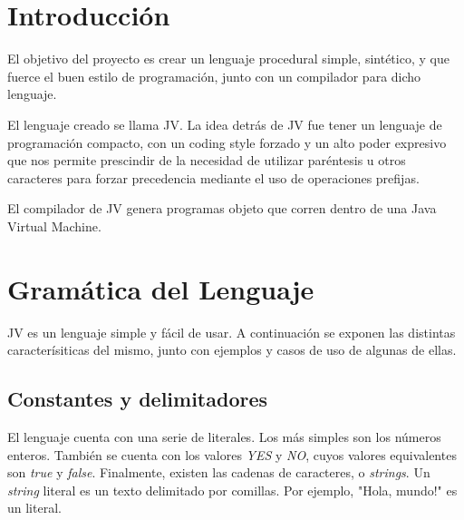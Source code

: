 \documentclass{article}
\begin{document}
    
    \clearpage
    \tableofcontents
    
    \clearpage

    \section{Introducción}
        \par El objetivo del proyecto es crear un lenguaje procedural simple, sintético, y que fuerce el buen estilo de programación, junto con un compilador para dicho lenguaje.\\
        \par El lenguaje creado se llama JV. La idea detrás de JV fue tener un lenguaje de programación compacto, con un coding style forzado y un alto poder expresivo que nos permite prescindir de la necesidad de utilizar paréntesis u otros caracteres para forzar precedencia mediante el uso de operaciones prefijas.
        \par El compilador de JV genera  programas objeto que corren dentro de una Java Virtual Machine.
    \clearpage


    \section{Gramática del Lenguaje}

        \par JV es un lenguaje simple y fácil de usar. A continuación se exponen las distintas caracterísiticas del mismo, junto con ejemplos y casos de uso de algunas de ellas.
        \\

        \subsection{Constantes y delimitadores}

            \par El lenguaje cuenta con una serie de literales. Los más simples son los números enteros. También se cuenta con los valores \textit{YES} y \textit{NO}, cuyos valores equivalentes son \textit{true} y \textit{false}. Finalmente, existen las cadenas de caracteres, o \textit{strings}. Un \textit{string} literal es un texto delimitado por comillas. Por ejemplo, "Hola, mundo!" es un literal. 
\end{document}
